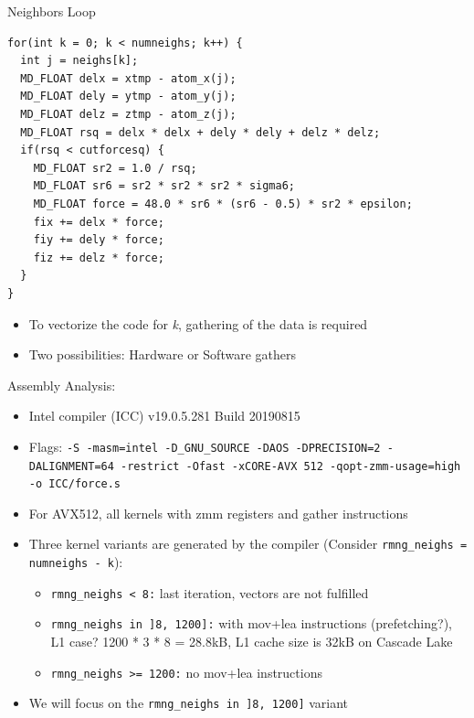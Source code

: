 \documentclass[aspectratio=43,t]{beamer}
\begin{document}
  \begin{frame}[fragile]{Neighbors Loop}
    \begin{lstlisting}
for(int k = 0; k < numneighs; k++) {
  int j = neighs[k];
  MD_FLOAT delx = xtmp - atom_x(j);
  MD_FLOAT dely = ytmp - atom_y(j);
  MD_FLOAT delz = ztmp - atom_z(j);
  MD_FLOAT rsq = delx * delx + dely * dely + delz * delz;
  if(rsq < cutforcesq) {
    MD_FLOAT sr2 = 1.0 / rsq;
    MD_FLOAT sr6 = sr2 * sr2 * sr2 * sigma6;
    MD_FLOAT force = 48.0 * sr6 * (sr6 - 0.5) * sr2 * epsilon;
    fix += delx * force;
    fiy += dely * force;
    fiz += delz * force;
  }
}
    \end{lstlisting}
    \begin{itemize}
      \item To vectorize the code for \emph{k}, gathering of the data is required
      \item Two possibilities: Hardware or Software gathers
    \end{itemize}
  \end{frame}

  \begin{frame}[fragile]{Assembly Analysis:}
    \begin{itemize}
      \item Intel compiler (ICC) v19.0.5.281 Build 20190815
      \item Flags: \texttt{-S -masm=intel -D\_GNU\_SOURCE -DAOS -DPRECISION=2 -DALIGNMENT=64 -restrict -Ofast -xCORE-AVX 512 -qopt-zmm-usage=high -o ICC/force.s}
      \item For AVX512, all kernels with zmm registers and gather instructions
      \item Three kernel variants are generated by the compiler (Consider \texttt{rmng\_neighs = numneighs - k}):
      \begin{itemize}
        \item \texttt{rmng\_neighs < 8:} last iteration, vectors are not fulfilled
        \item \texttt{rmng\_neighs in ]8, 1200]:} with mov+lea instructions (prefetching?), L1 case? 1200 * 3 * 8 = 28.8kB, L1 cache size is 32kB on Cascade Lake
        \item \texttt{rmng\_neighs >= 1200:} no mov+lea instructions
      \end{itemize}
      \item We will focus on the \texttt{rmng\_neighs in ]8, 1200]} variant
    \end{itemize}
  \end{frame}
\end{document}
